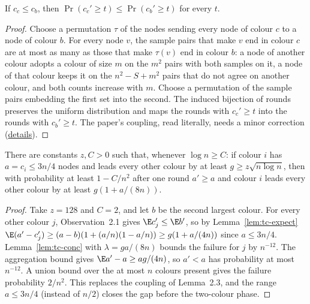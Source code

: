 \begin{lemma}\label{lem:tc-stochdom}
\leanok{}
If $c_c\le c_b$, then $\Pr(c_c'\ge t)\le\Pr(c_b'\ge t)$ for every $t$.
\end{lemma}
\begin{proof}\leanok
Choose a permutation $\tau$ of the nodes sending every node of colour $c$ to a node of colour $b$.
For every node $v$, the sample pairs that make $v$ end in colour $c$ are at most as many as those
that make $\tau(v)$ end in colour $b$: a node of another colour adopts a colour of size $m$ on the
$m^2$ pairs with both samples on it, a node of that colour keeps it on the $n^2-S+m^2$ pairs that
do not agree on another colour, and both counts increase with $m$. Choose a permutation of the
sample pairs embedding the first set into the second.
The induced bijection of rounds preserves the uniform distribution and maps the rounds with
$c_c'\ge t$ into the rounds with $c_b'\ge t$. The paper's coupling, read literally, needs a minor
correction
(\href{https://github.com/formal-dynamics/leanamics/blob/main/median/FORMALIZATION_DIFFERENCES.md#remarks-on-the-sources}{details}).
\end{proof}

\begin{lemma}\label{lem:tc-growth-round}
\leanok{}
There are constants $z,C>0$ such that, whenever $\log n\ge C$: if colour $i$ has $a=c_i\le3n/4$
nodes and leads every other colour by at least $g\ge z\sqrt{n\log n}$, then with probability at
least $1-C/n^2$ after one round $a'\ge a$ and colour $i$ leads every other colour by at least
$g(1+a/(8n))$.
\end{lemma}
\begin{proof}\leanok
Take $z=128$ and $C=2$, and let $b$ be the second largest colour. For every other colour $j$,
Observation~2.1 gives $\E c_j'\le\E b'$, so by Lemma~\ref{lem:tc-expect}
$\E(a'-c_j')\ge(a-b)(1+(a/n)(1-a/n))\ge g(1+a/(4n))$ since $a\le3n/4$. Lemma~\ref{lem:tc-conc}
with $\lambda=ga/(8n)$ bounds the failure for $j$ by $n^{-12}$. The aggregation bound gives
$\E a'-a\ge ag/(4n)$, so $a'<a$ has probability at most $n^{-12}$. A union bound over the at most
$n$ colours present gives the failure probability $2/n^2$. This replaces the coupling of
Lemma~2.3, and the range $a\le3n/4$ (instead of $n/2$) closes the gap before the two-colour
phase.
\end{proof}

